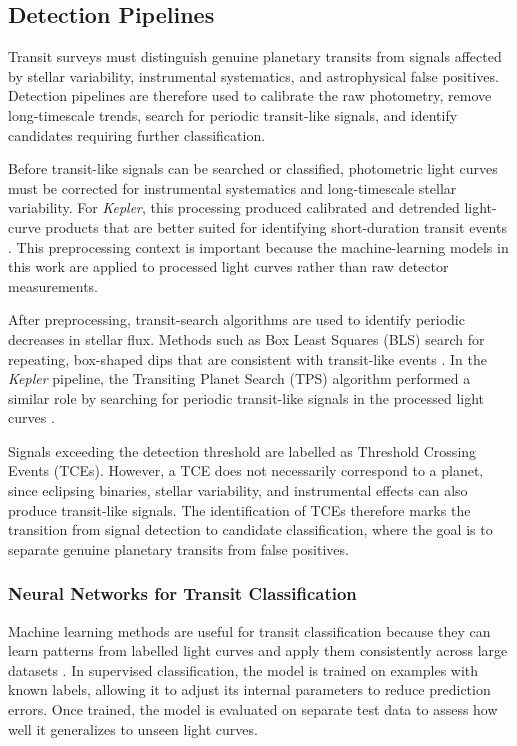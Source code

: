 \subsection{Detection Pipelines}

Transit surveys must distinguish genuine planetary transits from signals affected by stellar variability, instrumental systematics, and astrophysical false positives. Detection pipelines are therefore used to calibrate the raw photometry, remove long-timescale trends, search for periodic transit-like signals, and identify candidates requiring further classification.

Before transit-like signals can be searched or classified, photometric light curves must be corrected for instrumental systematics and long-timescale stellar variability. For \textit{Kepler}, this processing produced calibrated and detrended light-curve products that are better suited for identifying short-duration transit events \citep{Jenkins_TCE_Label, 2018ApJS..235...38T}. This preprocessing context is important because the machine-learning models in this work are applied to processed light curves rather than raw detector measurements.

After preprocessing, transit-search algorithms are used to identify periodic decreases in stellar flux. Methods such as Box Least Squares (BLS) search for repeating, box-shaped dips that are consistent with transit-like events \citep{BLS_Algorithm}. In the \textit{Kepler} pipeline, the Transiting Planet Search (TPS) algorithm performed a similar role by searching for periodic transit-like signals in the processed light curves \citep{Jenkins_TCE_Label}.

Signals exceeding the detection threshold are labelled as Threshold Crossing Events (TCEs). However, a TCE does not necessarily correspond to a planet, since eclipsing binaries, stellar variability, and instrumental effects can also produce transit-like signals. The identification of TCEs therefore marks the transition from signal detection to candidate classification, where the goal is to separate genuine planetary transits from false positives.

\subsubsection{Neural Networks for Transit Classification} 

Machine learning methods are useful for transit classification because they can learn patterns from labelled light curves and apply them consistently across large datasets \citep{2018AJ....155..147Z}. In supervised classification, the model is trained on examples with known labels, allowing it to adjust its internal parameters to reduce prediction errors. Once trained, the model is evaluated on separate test data to assess how well it generalizes to unseen light curves.

